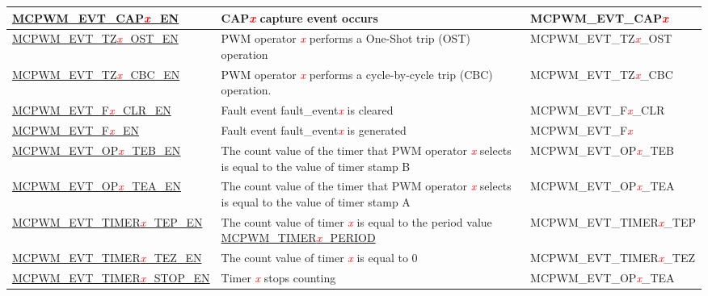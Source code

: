 \begin{ThreePartTable}
\begin{longtable}{| p{5.1cm} | p{7cm} | p{4.2cm} |}
    \hyperref[fielddesc:MCPWMEVTCAP0EN]{MCPWM\_EVT\_CAP\textcolor{red}{\it{x}}\_EN}  
    &  CAP\textcolor{red}{\it{x}} capture event occurs
    &  MCPWM\_EVT\_CAP\textcolor{red}{\it{x}}    \\\hline
    \hyperref[fielddesc:MCPWMEVTTZ0OSTEN]{MCPWM\_EVT\_TZ\textcolor{red}{\it{x}}\_OST\_EN}  
    &  PWM operator \textcolor{red}{\it{x}} performs a One-Shot trip (OST) operation
    &  MCPWM\_EVT\_TZ\textcolor{red}{\it{x}}\_OST    \\\hline
    \hyperref[fielddesc:MCPWMEVTTZ0CBCEN]{MCPWM\_EVT\_TZ\textcolor{red}{\it{x}}\_CBC\_EN}
    & PWM operator \textcolor{red}{\it{x}} performs a cycle-by-cycle trip (CBC) operation.
    & MCPWM\_EVT\_TZ\textcolor{red}{\it{x}}\_CBC    \\\hline
    \hyperref[fielddesc:MCPWMEVTF0CLREN]{MCPWM\_EVT\_F\textcolor{red}{\it{x}}\_CLR\_EN}
    & Fault event fault\_event\textcolor{red}{\it{x}} is cleared
    & MCPWM\_EVT\_F\textcolor{red}{\it{x}}\_CLR    \\\hline
    \hyperref[fielddesc:MCPWMEVTF0EN]{MCPWM\_EVT\_F\textcolor{red}{\it{x}}\_EN}
    & Fault event fault\_event\textcolor{red}{\it{x}} is generated
    & MCPWM\_EVT\_F\textcolor{red}{\it{x}}    \\\hline
    \hyperref[fielddesc:MCPWMEVTOP0TEBEN]{MCPWM\_EVT\_OP\textcolor{red}{\it{x}}\_TEB\_EN}
    & The count value of the timer that PWM operator \textcolor{red}{\it{x}} selects is equal to the value of timer stamp B\tnote{1}
    & MCPWM\_EVT\_OP\textcolor{red}{\it{x}}\_TEB    \\\hline
    \hyperref[fielddesc:MCPWMEVTOP0TEAEN]{MCPWM\_EVT\_OP\textcolor{red}{\it{x}}\_TEA\_EN}
    & The count value of the timer that PWM operator \textcolor{red}{\it{x}} selects is equal to the value of timer stamp A\tnote{1}
    & MCPWM\_EVT\_OP\textcolor{red}{\it{x}}\_TEA    \\\hline
    \hyperref[fielddesc:MCPWMEVTTIMER0TEPEN]{MCPWM\_EVT\_TIMER\textcolor{red}{\it{x}}\_TEP\_EN}
    & The count value of timer \textcolor{red}{\it{x}} is equal to the period value \hyperref[fielddesc:MCPWMTIMER0PERIOD]{MCPWM\_TIMER\textcolor{red}{\it{x}}\_PERIOD}
    & MCPWM\_EVT\_TIMER\textcolor{red}{\it{x}}\_TEP    \\\hline
    \hyperref[fielddesc:MCPWMEVTTIMER0TEZEN]{MCPWM\_EVT\_TIMER\textcolor{red}{\it{x}}\_TEZ\_EN}
    & The count value of timer \textcolor{red}{\it{x}} is equal to 0
    & MCPWM\_EVT\_TIMER\textcolor{red}{\it{x}}\_TEZ    \\\hline
    \hyperref[fielddesc:MCPWMEVTTIMER0STOPEN]{MCPWM\_EVT\_TIMER\textcolor{red}{\it{x}}\_STOP\_EN}
    & Timer \textcolor{red}{\it{x}} stops counting
    & MCPWM\_EVT\_OP\textcolor{red}{\it{x}}\_TEA    \\\hline
\end{longtable}
\end{ThreePartTable}